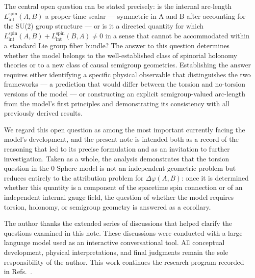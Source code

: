 \documentclass[%
 reprint,
 amsmath,amssymb,
 aps,
 prb,
]{revtex4-2}
\numberwithin{equation}{section}
\newcommand{\Lspin}{L_{\text{int}}^{\text{spin}}}
\begin{document}
The central open question can be stated precisely: is the internal arc-length $\Lspin(A,B)$ a proper-time scalar --- symmetric in A and B after accounting for the SU(2) group structure --- or is it a directed quantity for which $\Lspin(A,B) + \Lspin(B,A) \neq 0$ in a sense that cannot be accommodated within a standard Lie group fiber bundle? The answer to this question determines whether the model belongs to the well-established class of spinorial holonomy theories or to a new class of causal semigroup geometries. Establishing the answer requires either identifying a specific physical observable that distinguishes the two frameworks --- a prediction that would differ between the torsion and no-torsion versions of the model --- or constructing an explicit semigroup-valued arc-length from the model's first principles and demonstrating its consistency with all previously derived results.

We regard this open question as among the most important currently facing the model's development, and the present note is intended both as a record of the reasoning that led to its precise formulation and as an invitation to further investigation. Taken as a whole, the analysis demonstrates that the torsion question in the 0-Sphere model is not an independent geometric problem but reduces entirely to the attribution problem for $\Delta\varphi(A,B)$: once it is determined whether this quantity is a component of the spacetime spin connection or of an independent internal gauge field, the question of whether the model requires torsion, holonomy, or semigroup geometry is answered as a corollary.

\begin{acknowledgments}
The author thanks the extended series of discussions that helped clarify the questions examined in this note. These discussions were conducted with a large language model used as an interactive conversational tool. All conceptual development, physical interpretations, and final judgments remain the sole responsibility of the author. This work continues the research program recorded in Refs.~\cite{paper29,paper30,paper31,paper32,paper33,paper35,paper38,paper40}.
\end{acknowledgments}
\end{document}
